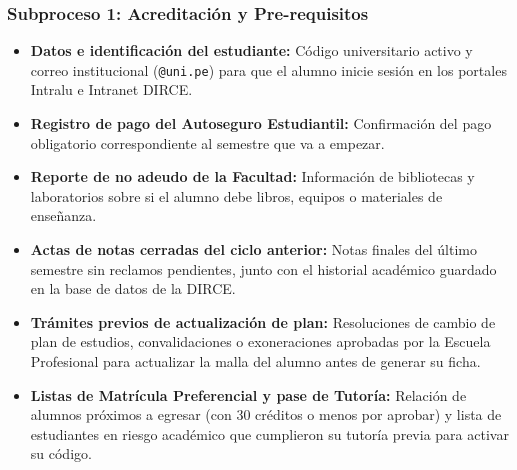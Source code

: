 \subsubsection{Subproceso 1: Acreditación y Pre-requisitos}

\begin{itemize}
    \item \textbf{Datos e identificación del estudiante:} Código universitario activo y correo institucional (\texttt{@uni.pe}) para que el alumno inicie sesión en los portales Intralu e Intranet DIRCE.

    \item \textbf{Registro de pago del Autoseguro Estudiantil:} Confirmación del pago obligatorio correspondiente al semestre que va a empezar.

    \item \textbf{Reporte de no adeudo de la Facultad:} Información de bibliotecas y laboratorios sobre si el alumno debe libros, equipos o materiales de enseñanza.

    \item \textbf{Actas de notas cerradas del ciclo anterior:} Notas finales del último semestre sin reclamos pendientes, junto con el historial académico guardado en la base de datos de la DIRCE.

    \item \textbf{Trámites previos de actualización de plan:} Resoluciones de cambio de plan de estudios, convalidaciones o exoneraciones aprobadas por la Escuela Profesional para actualizar la malla del alumno antes de generar su ficha.

    \item \textbf{Listas de Matrícula Preferencial y pase de Tutoría:} Relación de alumnos próximos a egresar (con 30 créditos o menos por aprobar) y lista de estudiantes en riesgo académico que cumplieron su tutoría previa para activar su código.
\end{itemize}
